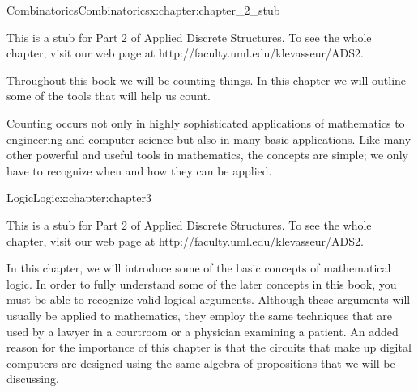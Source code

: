 \documentclass[oneside,10pt,]{book}
\numberwithin{equation}{section}
\begin{document}
%
%
\typeout{************************************************}
\typeout{************************************************}
%
\begin{chapterptx}{Combinatorics}{}{Combinatorics}{}{}{x:chapter:chapter_2_stub}
\begin{introduction}{}%
This is a stub for Part 2 of Applied Discrete Structures. To see the whole chapter, visit our web page at http:\slash{}\slash{}faculty.uml.edu\slash{}klevasseur\slash{}ADS2.%
\par
Throughout this book we will be counting things. In this chapter we will outline some of the tools that will help us count.%
\par
Counting occurs not only in highly sophisticated applications of mathematics to engineering and computer science but also in many basic applications. Like many other powerful and useful tools in mathematics, the concepts are simple; we only have to recognize when and how they can be applied.%
\end{introduction}%
\end{chapterptx}
%
%
\typeout{************************************************}
\typeout{************************************************}
%
\begin{chapterptx}{Logic}{}{Logic}{}{}{x:chapter:chapter3}
\begin{introduction}{}%
This is a stub for Part 2 of Applied Discrete Structures. To see the whole chapter, visit our web page at http:\slash{}\slash{}faculty.uml.edu\slash{}klevasseur\slash{}ADS2.%
\par
In this chapter, we will introduce some of the basic concepts of mathematical logic. In order to fully understand some of the later concepts in this 	book, you must be able to recognize valid logical arguments. Although these arguments will usually be applied to mathematics, they employ the same techniques that are used by a lawyer in a courtroom or a physician examining a patient. An added reason for the importance of this chapter is that the circuits that make up digital computers are designed using the same algebra of propositions that we will be discussing.%
\end{introduction}%
\end{chapterptx}
%
%
\typeout{************************************************}
\typeout{************************************************}
%
\end{document}
